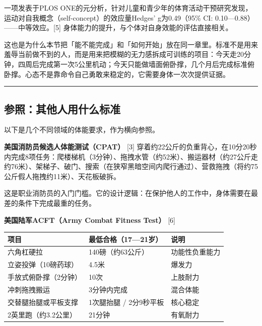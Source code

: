\documentclass[UTF8,zihao=-4,oneside]{ctexart}
\begin{document}
一项发表于PLOS ONE的元分析，针对儿童和青少年的体育活动干预研究发现，运动对自我概念（self-concept）的效应量Hedges' g为0.49（95\% CI: 0.10—0.88）——中等效应。[5] 身体能力的提升，与个体对自身效能的评估直接相关。

这也是为什么本节把「能不能完成」和「如何开始」放在同一章里。标准不是用来羞辱当前做不到的人，而是用来把模糊的无力感拆成可训练的项目：今天走20分钟，四周后完成第一次5公里机动；今天只能做墙面俯卧撑，几个月后完成标准俯卧撑。心态不是靠命令自己勇敢来稳定的，它需要身体一次次提供证据。

\vspace{0.35em}\noindent\textcolor{RuleInk}{\rule{\linewidth}{0.35pt}}\vspace{0.35em}

\subsection*{参照：其他人用什么标准}

以下是几个不同领域的体能要求，作为横向参照。

\textbf{美国消防员候选人体能测试（CPAT）} [3]
穿着约22公斤的负重背心，在10分20秒内完成8项任务：爬楼梯机（3分钟）、拖拽水管（约52米）、搬运器材（约27公斤走约76米）、架梯子、破门、搜索（在狭窄黑暗空间内爬行通过）、营救拖拽（将约75公斤假人拖拽约11米）、天花板破拆。

这是职业消防员的入门门槛。它的设计逻辑：在保护他人的工作中，身体需要在最差的条件下完成最重的任务。

\textbf{美国陆军ACFT（Army Combat Fitness Test）} [6]

\begin{table}[H]
\centering
\footnotesize
\renewcommand{\arraystretch}{1.18}
\begin{tabularx}{\linewidth}{@{}>{\RaggedRight\arraybackslash}X>{\RaggedRight\arraybackslash}X>{\RaggedRight\arraybackslash}X@{}}
\toprule
\textbf{项目} & \textbf{最低合格（17—21岁）} & \textbf{说明} \\
\midrule
六角杠硬拉 & 140磅（约63公斤） & 功能性负重能力 \\
立姿投弹（10磅药球） & 4.5米 & 爆发力 \\
手放式俯卧撑（2分钟） & 10次 & 上肢耐力 \\
冲刺拖拽搬运 & 3分钟内完成 & 混合体能 \\
交替腿抬腿或平板支撑 & 1次腿抬腿 / 2分9秒平板 & 核心稳定 \\
2英里跑（约3.2公里） & 21分钟 & 有氧耐力 \\
\bottomrule
\end{tabularx}
\end{table}
\end{document}
